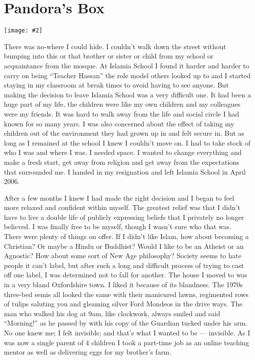 \documentclass[12pt]{memoir}
\newcommand{\cor}[2]{#2} %
\newcommand{\img}[3]{\begin{center}%
\texttt{[image: \#2]}\\{\small\em#3}%
\end{center}}
\begin{document}
\chapter{Pandora’s Box}

\img{scale=0.5}{Pandoras_Box.jpg}{}

There was no-where I could hide.
I couldn’t walk down the street without bumping into this or that brother
or sister or child from my school or acquaintance from the mosque.
At Islamia School I found it harder and harder to carry on
being “Teacher Hassan” the role model others looked up to
and I started staying in my classroom at break times
to \cor{avoiding}{avoid} having to see anyone.
But making the decision to leave Islamia School was a very difficult one.
It had been a huge part of my life, the children were like my own children
and my colleagues were my friends.
It was hard to walk away from the life and social circle
I had known for so many years.
I was also concerned about the effect of taking my children
out of the environment they had grown up in and felt secure in.
But as long as I remained at the school I knew I couldn’t move on.
I had to take stock of who I was and where I was.
I needed space.
I wanted to change everything and make a fresh start,
get away from religion and get away from the expectations that surrounded me.
I handed in my resignation and left Islamia School in April 2006.

After a few months I knew I had made the right decision
and I began to feel more relaxed and confident within myself.
The greatest relief was that I didn’t have to live a double life
of publicly expressing beliefs that I privately no longer believed.
I was finally free to be myself, though I wasn’t sure who that was.
There were plenty of things on offer.
If I didn’t like Islam, how about becoming a Christian?
Or maybe a Hindu or Buddhist?
Would I like to be an Atheist or an Agnostic?
How about some sort of New Age philosophy?
Society seems to hate people it can’t label,
but after such a long and difficult process of trying to cast off one label,
I was determined not to fall for another.
The house I moved to was in a very bland Oxfordshire town.
I liked it because of its blandness.
The 1970s three-bed semis all looked the same with their manicured lawns,
regimented rows of tulips saluting you
and gleaming silver Ford Mondeos in the drive ways.
The man who walked his dog at 9am, like clockwork, always smiled
and said “Morning!” as he passed by with his copy
of the Guardian tucked under his arm.
No one knew me; I felt invisible; and that’s what I wanted to be — invisible.
As I was now a single parent of 4 children I took a part-time job
as an online teaching mentor as well as delivering eggs for my brother’s farm.
\end{document}
